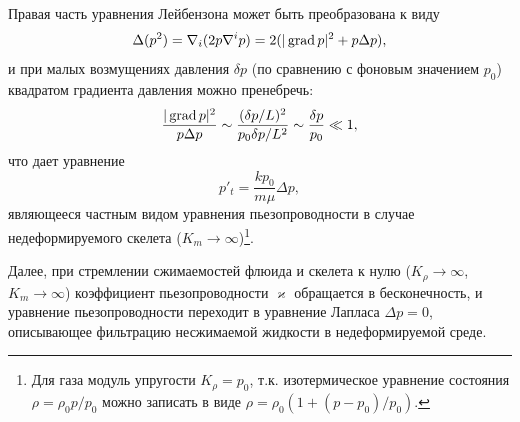 Правая часть уравнения Лейбензона может быть преобразована к виду
\[
\Delta(p^2)=\nabla_i(2p\nabla^i p)=2(|\operatorname{grad} p|^2+p\Delta p),
\]
и при малых возмущениях давления $\delta p$ (по сравнению с фоновым значением $p_0$) квадратом градиента давления можно пренебречь:
\[
\frac{|\operatorname{grad} p|^2}{p\Delta p}\sim\frac{(\delta p/L)^2}{p_0\delta p/L^2}\sim\frac{\delta p}{p_0}\ll1,
\]
\setcounter{footnote}{0}
что дает уравнение
\[
p'_t=\frac{kp_0}{m\mu}\Delta p,
\]
являющееся частным видом уравнения пьезопроводности в случае недеформируемого скелета ($K_m\to\infty$)\footnote{Для газа модуль упругости $K_\rho=p_0$, т.к. изотермическое уравнение состояния $\rho=\rho_0p/p_0$ можно записать в виде $\rho=\rho_0(1+(p-p_0)/p_0)$.}.

Далее, при стремлении сжимаемостей флюида и скелета к нулю ($K_\rho\to\infty$, $K_m\to\infty$) коэффициент пьезопроводности $\varkappa$ обращается в бесконечность, и уравнение пьезопроводности переходит в уравнение Лапласа $\Delta p=0$, описывающее фильтрацию несжимаемой жидкости в недеформируемой среде.
